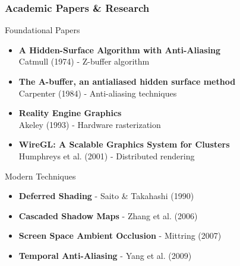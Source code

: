 \begin{frame}
\frametitle{Academic Papers \& Research}

\begin{mathbox}{Foundational Papers}
\begin{itemize}
    \item \textbf{A Hidden-Surface Algorithm with Anti-Aliasing} \\
          Catmull (1974) - Z-buffer algorithm
    \item \textbf{The A-buffer, an antialiased hidden surface method} \\
          Carpenter (1984) - Anti-aliasing techniques
    \item \textbf{Reality Engine Graphics} \\
          Akeley (1993) - Hardware rasterization
    \item \textbf{WireGL: A Scalable Graphics System for Clusters} \\
          Humphreys et al. (2001) - Distributed rendering
\end{itemize}
\end{mathbox}

\begin{conceptbox}{Modern Techniques}
\begin{itemize}
    \item \textbf{Deferred Shading} - Saito \& Takahashi (1990)
    \item \textbf{Cascaded Shadow Maps} - Zhang et al. (2006)
    \item \textbf{Screen Space Ambient Occlusion} - Mittring (2007)
    \item \textbf{Temporal Anti-Aliasing} - Yang et al. (2009)
\end{itemize}
\end{conceptbox}

\end{frame}

